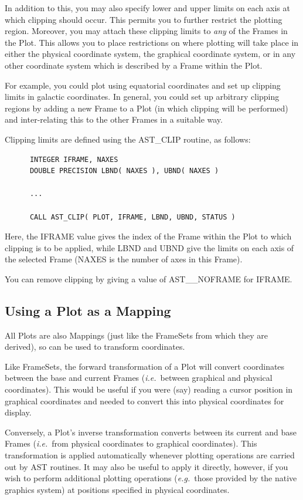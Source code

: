 \documentclass[twoside,11pt]{article}
\newcommand{\htmlref}[2]{#1}
\begin{document}
In addition to this, you may also specify lower and upper limits on
each axis at which clipping should occur. This permits you to further
restrict the plotting region. Moreover, you may attach these clipping
limits to {\em{any}} of the Frames in the Plot. This allows you to
place restrictions on where plotting will take place in either the
physical coordinate system, the graphical coordinate system, or in any
other coordinate system which is described by a \htmlref{Frame}{Frame} within the Plot.

For example, you could plot using equatorial coordinates and set up
clipping limits in galactic coordinates. In general, you could set up
arbitrary clipping regions by adding a new Frame to a Plot (in which
clipping will be performed) and inter-relating this to the other
Frames in a suitable way.

Clipping limits are defined using the \htmlref{AST\_CLIP}{AST_CLIP} routine, as follows:

\small
\begin{verbatim}
      INTEGER IFRAME, NAXES
      DOUBLE PRECISION LBND( NAXES ), UBND( NAXES )

      ...

      CALL AST_CLIP( PLOT, IFRAME, LBND, UBND, STATUS )
\end{verbatim}
\normalsize

Here, the IFRAME value gives the index of the Frame within the Plot to
which clipping is to be applied, while LBND and UBND give the limits
on each axis of the selected Frame (NAXES is the number of axes in
this Frame).

You can remove clipping by giving a value of AST\_\_NOFRAME for IFRAME.

\subsection{Using a Plot as a Mapping}

All Plots are also Mappings (just like the FrameSets from which they
are derived), so can be used to transform coordinates.

Like FrameSets, the forward transformation of a \htmlref{Plot}{Plot} will convert
coordinates between the base and current Frames ({\em{i.e.}}\ between
graphical and physical coordinates). This would be useful if you were
(say) reading a cursor position in graphical coordinates and needed to
convert this into physical coordinates for display.

Conversely, a Plot's inverse transformation converts between its
current and base Frames ({\em{i.e.}}\ from physical coordinates to
graphical coordinates). This transformation is applied automatically
whenever plotting operations are carried out by AST routines. It may
also be useful to apply it directly, however, if you wish to perform
additional plotting operations ({\em{e.g.}}\ those provided by the
native graphics system) at positions specified in physical
coordinates.
\end{document}
